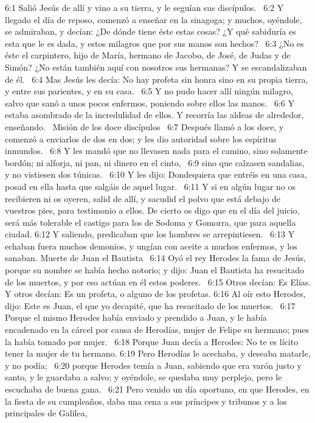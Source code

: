 6:1 Salió Jesús de allí y vino a su tierra, y le seguían sus discípulos.  
6:2 Y llegado el día de reposo, comenzó a enseñar en la sinagoga; y muchos, oyéndole, se admiraban, y decían: ¿De dónde tiene éste estas cosas? ¿Y qué sabiduría es esta que le es dada, y estos milagros que por sus manos son hechos?  
6:3 ¿No es éste el carpintero, hijo de María, hermano de Jacobo, de José, de Judas y de Simón? ¿No están también aquí con nosotros sus hermanas? Y se escandalizaban de él.  
6:4 Mas Jesús les decía: No hay profeta sin honra sino en su propia tierra, y entre sus parientes, y en su casa.  
6:5 Y no pudo hacer allí ningún milagro, salvo que sanó a unos pocos enfermos, poniendo sobre ellos las manos.  
6:6 Y estaba asombrado de la incredulidad de ellos. Y recorría las aldeas de alrededor, enseñando.  
Misión de los doce discípulos   
6:7 Después llamó a los doce, y comenzó a enviarlos de dos en dos; y les dio autoridad sobre los espíritus inmundos.  
6:8 Y les mandó que no llevasen nada para el camino, sino solamente bordón; ni alforja, ni pan, ni dinero en el cinto,  
6:9 sino que calzasen sandalias, y no vistiesen dos túnicas.  
6:10 Y les dijo: Dondequiera que entréis en una casa, posad en ella hasta que salgáis de aquel lugar.  
6:11 Y si en algún lugar no os recibieren ni os oyeren, salid de allí, y sacudid el polvo que está debajo de vuestros pies, para testimonio a ellos. De cierto os digo que en el día del juicio, será más tolerable el castigo para los de Sodoma y Gomorra, que para aquella ciudad. 
6:12 Y saliendo, predicaban que los hombres se arrepintiesen.  
6:13 Y echaban fuera muchos demonios, y ungían con aceite a muchos enfermos, y los sanaban. 
Muerte de Juan el Bautista   
6:14 Oyó el rey Herodes la fama de Jesús, porque su nombre se había hecho notorio; y dijo: Juan el Bautista ha resucitado de los muertos, y por eso actúan en él estos poderes.  
6:15 Otros decían: Es Elías. Y otros decían: Es un profeta, o alguno de los profetas. 
6:16 Al oír esto Herodes, dijo: Este es Juan, el que yo decapité, que ha resucitado de los muertos.  
6:17 Porque el mismo Herodes había enviado y prendido a Juan, y le había encadenado en la cárcel por causa de Herodías, mujer de Felipe su hermano; pues la había tomado por mujer.  
6:18 Porque Juan decía a Herodes: No te es lícito tener la mujer de tu hermano. 
6:19 Pero Herodías le acechaba, y deseaba matarle, y no podía;  
6:20 porque Herodes temía a Juan, sabiendo que era varón justo y santo, y le guardaba a salvo; y oyéndole, se quedaba muy perplejo, pero le escuchaba de buena gana.  
6:21 Pero venido un día oportuno, en que Herodes, en la fiesta de su cumpleaños, daba una cena a sus príncipes y tribunos y a los principales de Galilea,  
